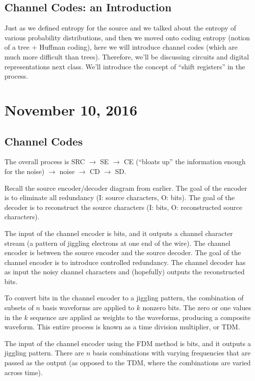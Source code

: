 \documentclass[11pt]{article}
\theoremstyle{definition}
\newcommand{\xhdr}[1]{\vspace{2mm}\noindent{{\bf #1.}}}
\begin{document}
\subsection{Channel Codes: an Introduction}

Just as we defined entropy for the source and we talked about the entropy of various probability distributions, and then we moved onto coding entropy (notion of a tree + Huffman coding), here we will introduce channel codes (which are much more difficult than trees). Therefore, we'll be discussing circuits and digital representations next class. We'll introduce the concept of ``shift registers'' in the process. 

\section{November 10, 2016}

\subsection{Channel Codes}

The overall process is SRC $\rightarrow$ SE $\rightarrow$ CE (``bloats up'' the information enough for the noise) $\rightarrow$ noise $\rightarrow$ CD $\rightarrow$ SD.  

\xhdr{Channel Coder} Recall the source encoder/decoder diagram from earlier. The goal of the encoder is to eliminate all redundancy (I: source characters, O: bits). The goal of the decoder is to reconstruct the source characters (I: bits, O: reconstructed source characters). 

\xhdr{Channel Encoder/Decoder} The input of the channel encoder is bits, and it outputs a channel character stream (a pattern of jiggling electrons at one end of the wire). The channel encoder is between the source encoder and the source decoder. The goal of the channel encoder is to introduce controlled redundancy. The channel decoder has as input the noisy channel characters and (hopefully) outputs the reconstructed bits. 

\example[TDM] To convert bits in the channel encoder to a jiggling pattern, the combination of subsets of $n$ basis waveforms are applied to $k$ nonzero bits. The zero or one values in the $k$ sequence are applied as weights to the waveforms, producing a composite waveform. This entire process is known as a time division multiplier, or TDM. 

\example[FDM] The input of the channel encoder using the FDM method is bits, and it outputs a jiggling pattern. There are $n$ basis combinations with varying frequencies that are passed as the output (as opposed to the TDM, where the combinations are varied across time). 
\end{document}
